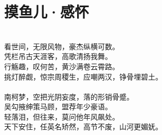 \section{摸鱼儿·感怀}
\leftskip=20mm
\noindent \\
看世间，无限风物，豪杰纵横可数。\\
凭栏吊古天涯客，高歌清扬我舞。\\
行觞趣，叹何苦，黄沙满卷云霄路。\\
挑灯醉觑，惊宗周稷生，应嘲两汉，铮骨埋碧土。\\
\\
南柯梦，空把光阴妄度，落的形销骨蹙。\\
吴勾掖绅策马顾，盟荐年少豪语。\\
轻落泪，但往来，莫问他年风飙处。\\
天下安住，任英名矫然，高节不废，山河更媚妩。